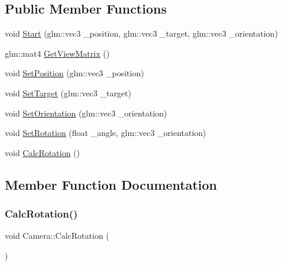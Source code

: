 \subsection*{Public Member Functions}
\begin{DoxyCompactItemize}
\item 
void \mbox{\hyperlink{class_camera_aaaf81f5649f2f9e003a922d4abd29c99}{Start}} (glm\+::vec3 \+\_\+position, glm\+::vec3 \+\_\+target, glm\+::vec3 \+\_\+orientation)
\item 
glm\+::mat4 \mbox{\hyperlink{class_camera_affa333055635aed96518c4c66be9a70c}{Get\+View\+Matrix}} ()
\item 
void \mbox{\hyperlink{class_camera_ab2c13ba0cd3d3b08feeab6a4f7d496bc}{Set\+Position}} (glm\+::vec3 \+\_\+position)
\item 
void \mbox{\hyperlink{class_camera_a9073f66c6522efed683d2867e197a6c8}{Set\+Target}} (glm\+::vec3 \+\_\+target)
\item 
void \mbox{\hyperlink{class_camera_a6518b723541de76a710e337a0ee364b0}{Set\+Orientation}} (glm\+::vec3 \+\_\+orientation)
\item 
void \mbox{\hyperlink{class_camera_ae054ebd0fdc18f36dfcd4a3c968ec471}{Set\+Rotation}} (float \+\_\+angle, glm\+::vec3 \+\_\+orientation)
\item 
void \mbox{\hyperlink{class_camera_a3d79803c1dc47d6c1065072a6c5cd8be}{Calc\+Rotation}} ()
\end{DoxyCompactItemize}


\subsection{Member Function Documentation}
\mbox{\label{class_camera_a3d79803c1dc47d6c1065072a6c5cd8be}} 
\subsubsection{\texorpdfstring{Calc\+Rotation()}{CalcRotation()}}
{\footnotesize\ttfamily void Camera\+::\+Calc\+Rotation (\begin{DoxyParamCaption}{ }\end{DoxyParamCaption})}

\mbox{\label{class_camera_affa333055635aed96518c4c66be9a70c}} 
